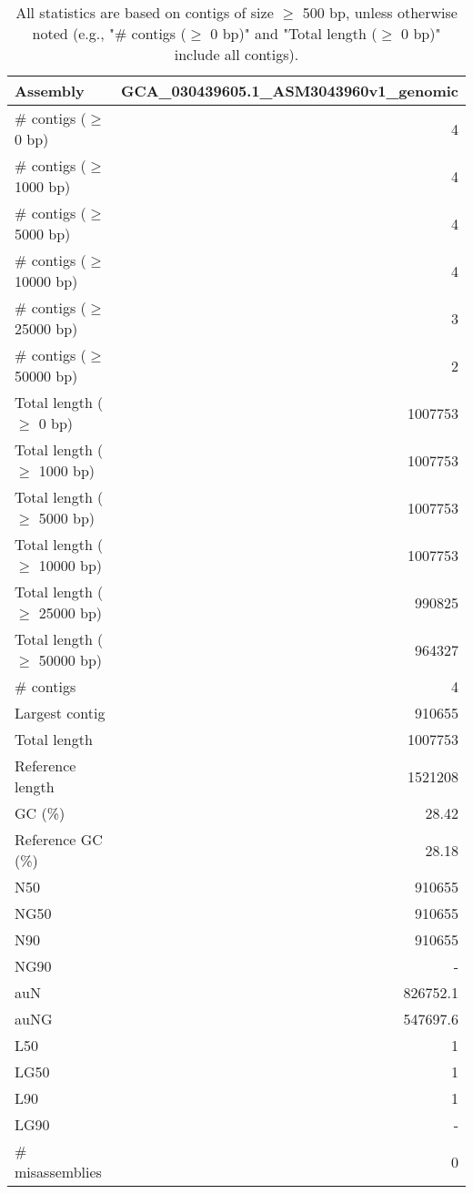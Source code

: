\documentclass[12pt,a4paper]{article}
\begin{document}
\begin{table}[ht]
\begin{center}
\caption{All statistics are based on contigs of size $\geq$ 500 bp, unless otherwise noted (e.g., "\# contigs ($\geq$ 0 bp)" and "Total length ($\geq$ 0 bp)" include all contigs).}
\begin{tabular}{|l*{1}{|r}|}
\hline
Assembly & GCA\_030439605.1\_ASM3043960v1\_genomic \\ \hline
\# contigs ($\geq$ 0 bp) & 4 \\ \hline
\# contigs ($\geq$ 1000 bp) & 4 \\ \hline
\# contigs ($\geq$ 5000 bp) & 4 \\ \hline
\# contigs ($\geq$ 10000 bp) & 4 \\ \hline
\# contigs ($\geq$ 25000 bp) & 3 \\ \hline
\# contigs ($\geq$ 50000 bp) & 2 \\ \hline
Total length ($\geq$ 0 bp) & 1007753 \\ \hline
Total length ($\geq$ 1000 bp) & 1007753 \\ \hline
Total length ($\geq$ 5000 bp) & 1007753 \\ \hline
Total length ($\geq$ 10000 bp) & 1007753 \\ \hline
Total length ($\geq$ 25000 bp) & 990825 \\ \hline
Total length ($\geq$ 50000 bp) & 964327 \\ \hline
\# contigs & 4 \\ \hline
Largest contig & 910655 \\ \hline
Total length & 1007753 \\ \hline
Reference length & 1521208 \\ \hline
GC (\%) & 28.42 \\ \hline
Reference GC (\%) & 28.18 \\ \hline
N50 & 910655 \\ \hline
NG50 & 910655 \\ \hline
N90 & 910655 \\ \hline
NG90 & - \\ \hline
auN & 826752.1 \\ \hline
auNG & 547697.6 \\ \hline
L50 & 1 \\ \hline
LG50 & 1 \\ \hline
L90 & 1 \\ \hline
LG90 & - \\ \hline
\# misassemblies & 0 \\ \hline

\end{tabular}
\end{center}
\end{table}
\end{document}
